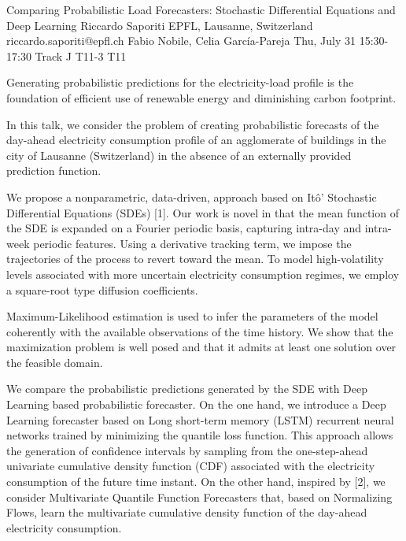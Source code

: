 \begin{talk}
  {Comparing Probabilistic Load Forecasters: Stochastic Differential Equations and Deep Learning}%
  {Riccardo Saporiti}%
  {EPFL, Lausanne, Switzerland}%
  {riccardo.saporiti@epfl.ch}%
  {Fabio Nobile, Celia García-Pareja}%
  {}%
  {Thu, July 31 15:30-17:30 Track J}%
  {T11-3}%
  {T11}%
  
				

Generating probabilistic predictions for the electricity-load profile is the foundation of efficient use of renewable energy and diminishing carbon footprint.

In this talk, we consider the problem of creating probabilistic forecasts of the day-ahead electricity consumption profile of an agglomerate of buildings in the city of Lausanne (Switzerland) in the absence of an externally provided prediction function. 
 
We propose a nonparametric, data-driven, approach based on Itô' Stochastic Differential Equations (SDEs) [1]. Our work is novel in that the mean function of the SDE is expanded on a Fourier periodic basis, capturing intra-day and intra-week periodic features. 
Using a derivative tracking term, we impose the trajectories of the process to revert toward the mean. To model high-volatility levels associated with more uncertain electricity consumption regimes, we employ a square-root type diffusion coefficients. 

Maximum-Likelihood estimation is used to infer the parameters of the model coherently with the available observations of the time history. We show that the maximization problem is well posed and that it admits at least one solution over the feasible domain. 

We compare the probabilistic predictions generated by the SDE with Deep Learning based probabilistic forecaster. 
On the one hand, we introduce a Deep Learning forecaster based on Long short-term memory (LSTM) recurrent neural networks trained by minimizing the quantile loss function. This approach allows the generation of confidence intervals by sampling from the one-step-ahead univariate cumulative density function (CDF) associated with the electricity consumption of the future time instant. 
On the other hand, inspired by [2], we consider Multivariate Quantile Function Forecasters that, based on Normalizing Flows, learn the multivariate cumulative density function of the day-ahead electricity consumption.


\end{talk}
